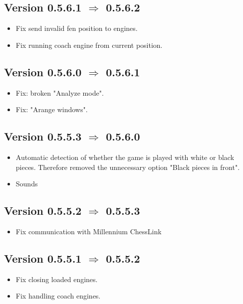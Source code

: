 \documentclass[11pt,a4paper]{article}
\begin{document}
\subsection*{Version 0.5.6.1  $\Rightarrow$  0.5.6.2}
\begin{itemize}
	\item Fix send invalid fen position to engines.
	\item Fix running coach engine from current position.
\end{itemize}

\subsection*{Version 0.5.6.0  $\Rightarrow$  0.5.6.1}
\begin{itemize}
	\item {\color{red}Fix}: broken "Analyze mode".
	\item {\color{red}Fix}: "Arange windows". 
\end{itemize}

\subsection*{Version 0.5.5.3  $\Rightarrow$  0.5.6.0}
\begin{itemize}
	\item Automatic detection of whether the game is played with white or black pieces.
	Therefore removed the unnecessary option "Black pieces in front".
	\item Sounds
\end{itemize}

\subsection*{Version 0.5.5.2  $\Rightarrow$  0.5.5.3}
\begin{itemize}
	\item Fix communication with Millennium ChessLink
\end{itemize}

\subsection*{Version 0.5.5.1  $\Rightarrow$  0.5.5.2}
\begin{itemize}
	\item Fix closing loaded engines.
    \item Fix handling coach engines.
\end{itemize}
\end{document}
